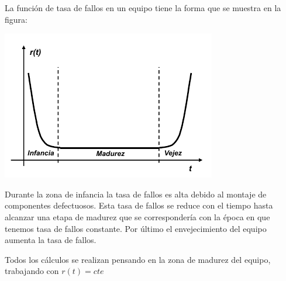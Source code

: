 \documentclass{apuntes}[nochap]
\begin{document}
La función de tasa de fallos en un equipo tiene la forma que se muestra en la figura:
\begin{center}
\includegraphics[width=0.7\linewidth]{img/tasa_fallos.png}
\end{center}

Durante la zona de infancia la tasa de fallos es alta debido al montaje de componentes defectuosos. Esta tasa de fallos se reduce con el tiempo hasta alcanzar una etapa de madurez que se correspondería con la época en que tenemos tasa de fallos constante. Por último el envejecimiento del equipo aumenta la tasa de fallos.

Todos los cálculos se realizan pensando en la zona de madurez del equipo, trabajando con $r(t)=cte$
\end{document}
